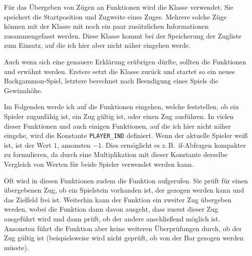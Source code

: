 Für das Übergeben von Zügen an Funktionen wird die Klasse  verwendet. Sie speichert die Startposition und Zugweite eines Zuges. Mehrere solche Züge können mit der Klasse  mit noch ein paar zusätzlichen Informationen zusammengefasst werden. Diese Klasse kommt bei der Speicherung der Zugliste zum Einsatz, auf die ich hier aber nicht näher eingehen werde.

\begin{sloppypar}
Auch wenn sich eine genauere Erklärung erübrigen dürfte, sollten die Funktionen  und  erwähnt werden. Erstere setzt die Klasse zurück und startet so ein neues Backgammon-Spiel, letztere berechnet nach Beendigung eines Spiels die Gewinnhöhe.
\end{sloppypar}

Im Folgenden werde ich auf die Funktionen eingehen, welche feststellen, ob ein Spieler zugunfähig ist, ein Zug gültig ist, oder einen Zug ausführen. In vielen dieser Funktionen und auch einigen Funktionen, auf die ich hier nicht näher eingehe, wird die Konstante \lstinline$PLAYER_IND$ definiert. Wenn der aktuelle Spieler weiß ist, ist der Wert $1$, ansonsten $-1$. Dies ermöglicht es z.\,B.~if-Abfragen kompakter zu formulieren, da durch eine Multiplikation mit dieser Konstante derselbe Vergleich von Werten für beide Spieler verwendet werden kann.

Oft wird in diesen Funktionen zudem die Funktion  aufgerufen. Sie prüft für einen übergebenen Zug, ob ein Spielstein vorhanden ist, der gezogen werden kann und das Zielfeld frei ist. Weiterhin kann der Funktion ein zweiter Zug übergeben werden, wobei die Funktion dann davon ausgeht, dass zuerst dieser Zug ausgeführt wird und dann prüft, ob der andere anschließend möglich ist. Ansonsten führt die Funktion aber keine weiteren Überprüfungen durch, ob der Zug gültig ist (beispielsweise wird nicht geprüft, ob von der Bar gezogen werden müsste).

